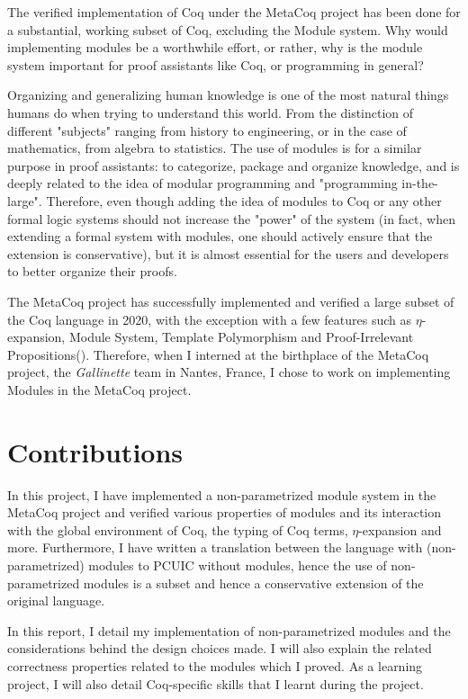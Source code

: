 The verified implementation of Coq under the MetaCoq project has been done for a
substantial, working subset of Coq, excluding the Module system. Why would
implementing modules be a worthwhile effort, or rather, why is the module system
important for proof assistants like Coq, or programming in general?

Organizing and generalizing human knowledge is one of the most natural things
humans do when trying to understand this world. From the distinction of
different "subjects" ranging from history to engineering, or in the case of
mathematics, from algebra to statistics. The use of modules is for a similar
purpose in proof assistants: to categorize, package and organize knowledge, and
is deeply related to the idea of modular programming and "programming
in-the-large". Therefore, even though adding the idea of modules to Coq or any
other formal logic systems should not increase the "power" of the system (in
fact, when extending a formal system with modules, one should actively ensure
that the extension is conservative), but it is almost essential for the users
and developers to better organize their proofs.

The MetaCoq project has successfully implemented and verified a large subset of
the Coq language in 2020, with the exception with a few features such as
$\eta$-expansion, Module System, Template Polymorphism and Proof-Irrelevant
Propositions(\cite{sozeau2020metacoq}). Therefore, when I interned at the
birthplace of the MetaCoq project, the \emph{Gallinette} team in Nantes, France,
I chose to work on implementing Modules in the MetaCoq project.

\section{Contributions}

In this project, I have implemented a non-parametrized module system in the
MetaCoq project and verified various properties of modules and its
interaction with the global environment of Coq, the typing of Coq terms,
$\eta$-expansion and more. Furthermore, I have written a translation between the
language with (non-parametrized) modules to PCUIC without modules, hence the use
of non-parametrized modules is a subset and hence a conservative extension of
the original language.

In this report, I detail my implementation of non-parametrized modules and the
considerations behind the design choices made. I will also explain the related
correctness properties related to the modules which I proved. As a learning
project, I will also detail Coq-specific skills that I learnt during the
project.

